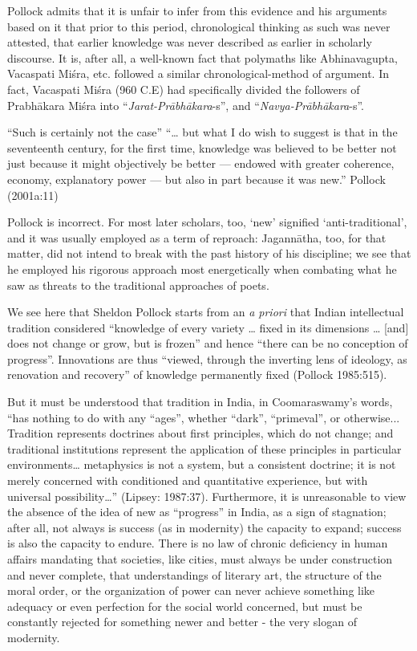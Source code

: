 Pollock admits that it is unfair to infer from this evidence and his arguments based on it that prior to this period, chronological thinking as such was never attested, that earlier knowledge was never described as earlier in scholarly discourse. It is, after all, a well-known fact that polymaths like Abhinavagupta, Vacaspati Miśra, etc. followed a similar chronological-method of argument. In fact, Vacaspati Miśra (960 C.E) had specifically divided the followers of Prabhākara Miśra into “{\sl Jarat-Prābhākara}-s”, and “{\sl Navya-Prābhākara}-s”.  
\begin{myquote}
“Such is certainly not the case”  “… but what I do wish to suggest is that in the seventeenth century, for the first time, knowledge was believed to be better not just because it might objectively be better — endowed with greater coherence, economy, explanatory power — but also in part because it was new.”  \hfill{Pollock (2001a:11)}
\end{myquote}

Pollock is incorrect. For most later scholars, too, ‘new’ signified ‘anti-traditional’, and it was usually employed as a term of reproach: Jagannātha, too, for that matter, did not intend to break with the past history of his discipline; we see that he employed his rigorous approach most energetically when combating what he saw as threats to the traditional approaches of poets.

We see here that Sheldon Pollock starts from an {\sl a priori} that Indian intellectual tradition considered “knowledge of every variety … fixed in its dimensions … [and] does not change or grow, but is frozen” and hence “there can be no conception of progress”. Innovations are thus “viewed, through the inverting lens of ideology, as renovation and recovery” of knowledge permanently fixed (Pollock 1985:515).  

But it must be understood that tradition in India, in Coomaraswamy’s words, “has nothing to do with any “ages”, whether “dark”, “primeval”, or otherwise... Tradition represents doctrines about first principles, which do not change; and traditional institutions represent the application of these principles in particular environments… metaphysics is not a system, but a consistent doctrine; it is not merely concerned with conditioned and quantitative experience, but with universal possibility…” (Lipsey: 1987:37). Furthermore, it is unreasonable to view the absence of the idea of new as “progress” in India, as a sign of stagnation; after all, not always is success (as in modernity) the capacity to expand; success is also the capacity to endure. There is no law of chronic deficiency in human affairs mandating that societies, like cities, must always be under construction and never complete, that understandings of literary art, the structure of the moral order, or the organization of power can never achieve something like adequacy or even perfection for the social world concerned, but must be constantly rejected for something newer and better - the very slogan of modernity.  

